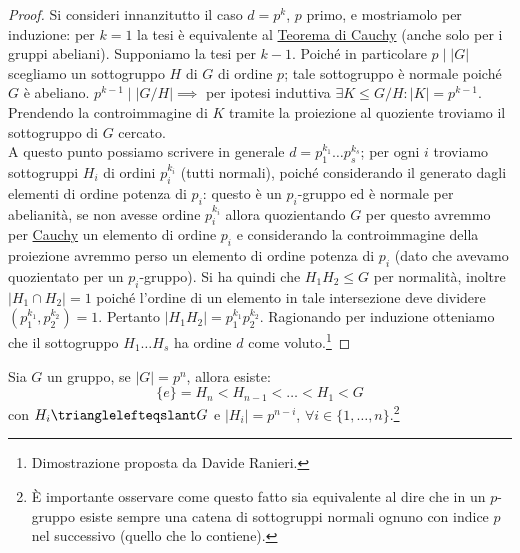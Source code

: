 \documentclass[11pt]{scrartcl}
\begin{document}
\begin{proof}
    Si consideri innanzitutto il caso $d=p^k$, $p$ primo, e mostriamolo per induzione:
    per $k=1$ la tesi è equivalente al \hyperref[p:Cauchy]{Teorema di Cauchy} (anche solo per i gruppi abeliani).
    Supponiamo la tesi per $k-1$. Poiché in particolare $p\mid |G|$ scegliamo un sottogruppo $H$ di $G$ di ordine $p$;
    tale sottogruppo è normale poiché $G$ è abeliano. $p^{k-1}\mid |G/H|\implies$ per ipotesi induttiva $\exists K \leqslant G/H : |K|=p^{k-1}$. \\
    Prendendo la controimmagine di $K$ tramite la proiezione al quoziente troviamo il sottogruppo di $G$ cercato. \\
    A questo punto possiamo scrivere in generale $d=p_1^{k_1}\ldots p_s^{k_s}$; per ogni $i$ troviamo sottogruppi $H_i$ di ordini $p_i^{k_i}$ (tutti normali), poiché considerando il generato dagli elementi di ordine potenza di $p_i$:
    questo è un $p_i$-gruppo ed è normale per abelianità, se non avesse ordine $p_i^{k_i}$ allora quozientando $G$ per questo avremmo per \hyperref[Cauchy]{Cauchy} un elemento di ordine $p_i$ e considerando la controimmagine della proiezione avremmo
    perso un elemento di ordine potenza di $p_i$ (dato che avevamo quozientato per un $p_i$-gruppo). Si ha quindi che $H_1H_2\leqslant G$ per normalità,
    inoltre $|H_1\cap H_2|=1$ poiché l'ordine di un elemento in tale intersezione deve dividere $(p_1^{k_1}, p_2^{k_2})=1$. Pertanto $|H_1H_2|=p_1^{k_1}p_2^{k_2}$.
    Ragionando per induzione otteniamo che il sottogruppo $H_1\ldots H_s$ ha ordine $d$ come voluto.\footnote{Dimostrazione proposta da Davide Ranieri.}
\end{proof}

\begin{exercise}
    Sia $G$ un gruppo, se $|G| = p^n$, allora esiste:
        \[ \{e\} = H_n < H_{n-1} < \ldots < H_1 < G
            \]
    con $H_i \trianglelefteqslant G$ e $|H_i| = p^{n-i}$, $\forall i \in \{1,\ldots,n\}$.\footnote{È importante osservare come questo fatto sia equivalente al dire che in un $p$-gruppo esiste sempre una catena di sottogruppi normali ognuno con indice $p$ nel successivo (quello che lo contiene).}
\end{exercise}
\end{document}
